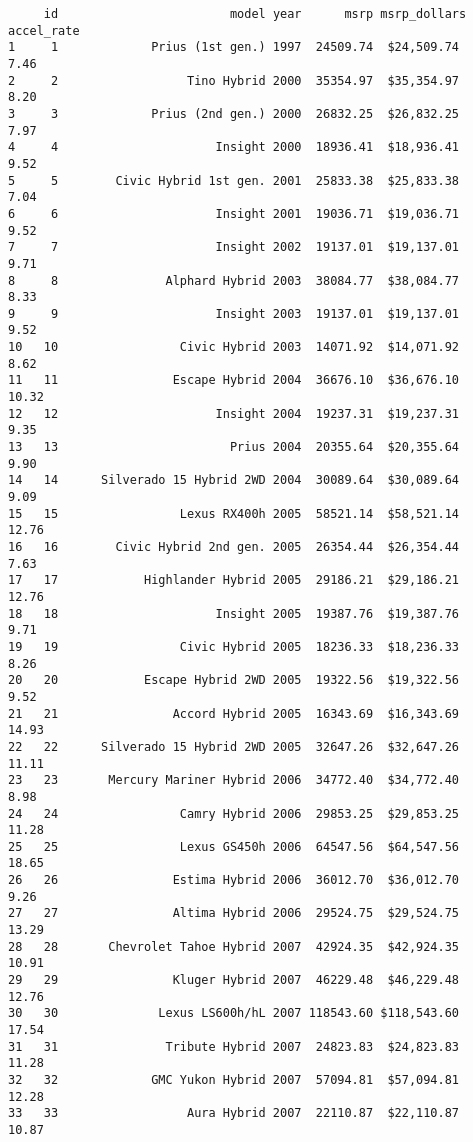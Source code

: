 \documentclass[
  letterpaper,
  DIV=11,
  numbers=noendperiod]{scrreprt}
\begin{document}
\begin{verbatim}
     id                        model year      msrp msrp_dollars accel_rate
1     1             Prius (1st gen.) 1997  24509.74  $24,509.74        7.46
2     2                  Tino Hybrid 2000  35354.97  $35,354.97        8.20
3     3             Prius (2nd gen.) 2000  26832.25  $26,832.25        7.97
4     4                      Insight 2000  18936.41  $18,936.41        9.52
5     5        Civic Hybrid 1st gen. 2001  25833.38  $25,833.38        7.04
6     6                      Insight 2001  19036.71  $19,036.71        9.52
7     7                      Insight 2002  19137.01  $19,137.01        9.71
8     8               Alphard Hybrid 2003  38084.77  $38,084.77        8.33
9     9                      Insight 2003  19137.01  $19,137.01        9.52
10   10                 Civic Hybrid 2003  14071.92  $14,071.92        8.62
11   11                Escape Hybrid 2004  36676.10  $36,676.10       10.32
12   12                      Insight 2004  19237.31  $19,237.31        9.35
13   13                        Prius 2004  20355.64  $20,355.64        9.90
14   14      Silverado 15 Hybrid 2WD 2004  30089.64  $30,089.64        9.09
15   15                 Lexus RX400h 2005  58521.14  $58,521.14       12.76
16   16        Civic Hybrid 2nd gen. 2005  26354.44  $26,354.44        7.63
17   17            Highlander Hybrid 2005  29186.21  $29,186.21       12.76
18   18                      Insight 2005  19387.76  $19,387.76        9.71
19   19                 Civic Hybrid 2005  18236.33  $18,236.33        8.26
20   20            Escape Hybrid 2WD 2005  19322.56  $19,322.56        9.52
21   21                Accord Hybrid 2005  16343.69  $16,343.69       14.93
22   22      Silverado 15 Hybrid 2WD 2005  32647.26  $32,647.26       11.11
23   23       Mercury Mariner Hybrid 2006  34772.40  $34,772.40        8.98
24   24                 Camry Hybrid 2006  29853.25  $29,853.25       11.28
25   25                 Lexus GS450h 2006  64547.56  $64,547.56       18.65
26   26                Estima Hybrid 2006  36012.70  $36,012.70        9.26
27   27                Altima Hybrid 2006  29524.75  $29,524.75       13.29
28   28       Chevrolet Tahoe Hybrid 2007  42924.35  $42,924.35       10.91
29   29                Kluger Hybrid 2007  46229.48  $46,229.48       12.76
30   30              Lexus LS600h/hL 2007 118543.60 $118,543.60       17.54
31   31               Tribute Hybrid 2007  24823.83  $24,823.83       11.28
32   32             GMC Yukon Hybrid 2007  57094.81  $57,094.81       12.28
33   33                  Aura Hybrid 2007  22110.87  $22,110.87       10.87

\end{verbatim}
\end{document}
